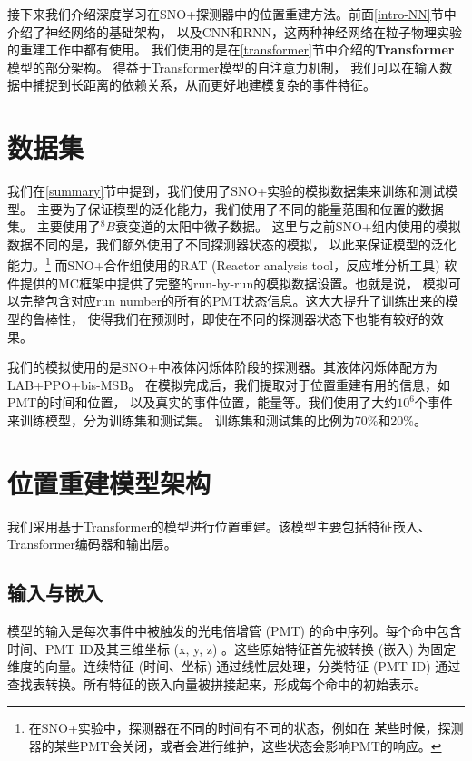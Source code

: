 接下来我们介绍深度学习在SNO+探测器中的位置重建方法。前面\ref{intro-NN}节中介绍了神经网络的基础架构，
以及CNN和RNN，这两种神经网络在粒子物理实验的重建工作中都有使用。
我们使用的是在\ref{transformer}节中介绍的\textbf{Transformer}模型的部分架构。
得益于Transformer模型的自注意力机制，
我们可以在输入数据中捕捉到长距离的依赖关系，从而更好地建模复杂的事件特征。

\section{数据集}\label{dataset}

我们在\ref{summary}节中提到，我们使用了SNO+实验的模拟数据集来训练和测试模型。
主要为了保证模型的泛化能力，我们使用了不同的能量范围和位置的数据集。
主要使用了${}^{8}B$衰变道的太阳中微子数据。
这里与之前SNO+组内使用的模拟数据不同的是，我们额外使用了不同探测器状态的模拟，
以此来保证模型的泛化能力。\footnote{在SNO+实验中，探测器在不同的时间有不同的状态，例如在
某些时候，探测器的某些PMT会关闭，或者会进行维护，这些状态会影响PMT的响应。}
而SNO+合作组使用的RAT (Reactor analysis tool，反应堆分析工具)
软件提供的MC框架中提供了完整的run-by-run的模拟数据设置。也就是说，
模拟可以完整包含对应run number的所有的PMT状态信息。这大大提升了训练出来的模型的鲁棒性，
使得我们在预测时，即使在不同的探测器状态下也能有较好的效果。

我们的模拟使用的是SNO+中液体闪烁体阶段的探测器。其液体闪烁体配方为LAB+PPO+bis-MSB。
在模拟完成后，我们提取对于位置重建有用的信息，如PMT的时间和位置，
以及真实的事件位置，能量等。我们使用了大约$10^6$个事件来训练模型，分为训练集和测试集。
训练集和测试集的比例为70\%和20\%。

\section{位置重建模型架构}\label{model_architecture}

我们采用基于Transformer的模型进行位置重建。该模型主要包括特征嵌入、Transformer编码器和输出层。

\subsection{输入与嵌入}
模型的输入是每次事件中被触发的光电倍增管 (PMT) 的命中序列。每个命中包含时间、PMT ID及其三维坐标 (x, y, z) 。这些原始特征首先被转换 (嵌入) 为固定维度的向量。连续特征 (时间、坐标) 通过线性层处理，分类特征 (PMT ID) 通过查找表转换。所有特征的嵌入向量被拼接起来，形成每个命中的初始表示。

